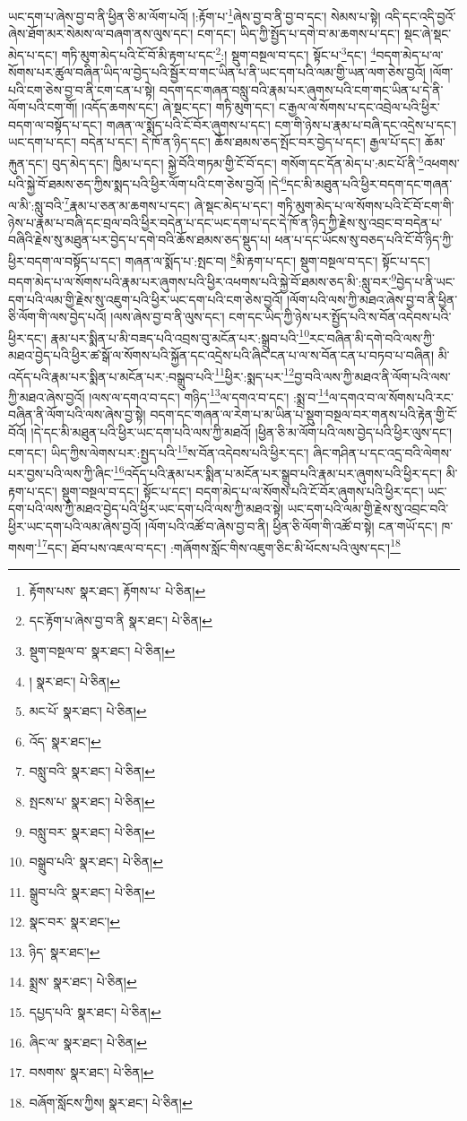 ཡང་དག་པ་ཞེས་བྱ་བ་ནི་ཕྱིན་ཅི་མ་ལོག་པའོ། །:རྟོག་པ་\footnote{རྟོགས་པས་  སྣར་ཐང་། རྟོགས་པ་  པེ་ཅིན། }ཞེས་བྱ་བ་ནི་བྱ་བ་དང་། སེམས་པ་སྟེ། འདི་དང་འདི་བྱའོ་ཞེས་ཐོག་མར་སེམས་ལ་བཞག་ནས་ལུས་དང་། ངག་དང་། ཡིད་ཀྱི་སྤྱོད་པ་དགེ་བ་མ་ཆགས་པ་དང་། སྡང་ཞེ་སྡང་མེད་པ་དང་། གཏི་མུག་མེད་པའི་ངོ་བོ་མི་རྟག་པ་དང་\footnote{དང་རྟོག་པ་ཞེས་བྱ་བ་ནི  སྣར་ཐང་།  པེ་ཅིན། }:། སྡུག་བསྔལ་བ་དང་། སྟོང་པ་\footnote{སྡུག་བསྔལ་བ་  སྣར་ཐང་།  པེ་ཅིན། }དང་། \footnote{།    སྣར་ཐང་།  པེ་ཅིན། }བདག་མེད་པ་ལ་སོགས་པར་ཚུལ་བཞིན་ཡིད་ལ་བྱེད་པའི་སྦྱོར་བ་གང་ཡིན་པ་ནི་ཡང་དག་པའི་ལམ་གྱི་ཡན་ལག་ཅེས་བྱའོ། །ལོག་པའི་ངག་ཅེས་བྱ་བ་ནི་ངག་ངན་པ་སྟེ། བདག་དང་གཞན་བསླུ་བའི་རྣམ་པར་ཞུགས་པའི་ངག་གང་ཡིན་པ་དེ་ནི་ལོག་པའི་ངག་གོ། །འདོད་ཆགས་དང་། ཞེ་སྡང་དང་། གཏི་མུག་དང་། ང་རྒྱལ་ལ་སོགས་པ་དང་འབྲེལ་པའི་ཕྱིར་བདག་ལ་བསྟོད་པ་དང་། གཞན་ལ་སྨོད་པའི་ངོ་བོར་ཞུགས་པ་དང་། ངག་གི་ཉེས་པ་རྣམ་པ་བཞི་དང་འདྲེས་པ་དང་། ཡང་དག་པ་དང་། བདེན་པ་དང་། དེ་ཁོ་ན་ཉིད་དང་། ཆོས་ཐམས་ཅད་སྤོང་བར་བྱེད་པ་དང་། རྒྱལ་པོ་དང་། ཆོམ་རྐུན་དང་། བུད་མེད་དང་། ཁྱིམ་པ་དང་། སྐྱེ་བོའི་གཏམ་གྱི་ངོ་བོ་དང་། གསོག་དང་དོན་མེད་པ་:མང་པོ་ནི་\footnote{མང་པོ་  སྣར་ཐང་།  པེ་ཅིན། }འཕགས་པའི་སྐྱེ་བོ་ཐམས་ཅད་ཀྱིས་སྨད་པའི་ཕྱིར་ལོག་པའི་ངག་ཅེས་བྱའོ། །དེ་\footnote{འོད་  སྣར་ཐང་། }དང་མི་མཐུན་པའི་ཕྱིར་བདག་དང་གཞན་ལ་མི་:སླུ་བའི་\footnote{བསླུ་བའི་  སྣར་ཐང་།  པེ་ཅིན། }རྣམ་པ་ཅན་མ་ཆགས་པ་དང་། ཞེ་སྡང་མེད་པ་དང་། གཏི་མུག་མེད་པ་ལ་སོགས་པའི་ངོ་བོ་ངག་གི་ཉེས་པ་རྣམ་པ་བཞི་དང་བྲལ་བའི་ཕྱིར་བདེན་པ་དང་ཡང་དག་པ་དང་དེ་ཁོ་ན་ཉིད་ཀྱི་རྗེས་སུ་འབྲང་བ་བདེན་པ་བཞིའི་རྗེས་སུ་མཐུན་པར་བྱེད་པ་དགེ་བའི་ཆོས་ཐམས་ཅད་སྡུད་པ། ཕན་པ་དང་ཡོངས་སུ་བཅད་པའི་ངོ་བོ་ཉིད་ཀྱི་ཕྱིར་བདག་ལ་བསྟོད་པ་དང་། གཞན་ལ་སྨོད་པ་:སྤང་བ། \footnote{སྤངས་པ་  སྣར་ཐང་།  པེ་ཅིན། }མི་རྟག་པ་དང་། སྡུག་བསྔལ་བ་དང་། སྟོང་པ་དང་། བདག་མེད་པ་ལ་སོགས་པའི་རྣམ་པར་ཞུགས་པའི་ཕྱིར་འཕགས་པའི་སྐྱེ་བོ་ཐམས་ཅད་མི་:སླུ་བར་\footnote{བསླུ་བར་  སྣར་ཐང་།  པེ་ཅིན། }བྱེད་པ་ནི་ཡང་དག་པའི་ལམ་གྱི་རྗེས་སུ་འཇུག་པའི་ཕྱིར་ཡང་དག་པའི་ངག་ཅེས་བྱའོ། །ལོག་པའི་ལས་ཀྱི་མཐའ་ཞེས་བྱ་བ་ནི་ཕྱིན་ཅི་ལོག་གི་ལས་བྱེད་པའོ། །ལས་ཞེས་བྱ་བ་ནི་ལུས་དང་། ངག་དང་ཡིད་ཀྱི་ཉེས་པར་སྤྱོད་པའི་ས་བོན་འདེབས་པའི་ཕྱིར་དང་། རྣམ་པར་སྨིན་པ་མི་བཟད་པའི་འབྲས་བུ་མངོན་པར་:སྒྲུབ་པའི་\footnote{བསྒྲུབ་པའི་  སྣར་ཐང་།  པེ་ཅིན། }རང་བཞིན་མི་དགེ་བའི་ལས་ཀྱི་མཐའ་བྱེད་པའི་ཕྱིར་ཚ་སྒོ་ལ་སོགས་པའི་སྐྱོན་དང་འདྲེས་པའི་ཞིང་ངན་པ་ལ་ས་བོན་ངན་པ་བཏབ་པ་བཞིན། མི་འདོད་པའི་རྣམ་པར་སྨིན་པ་མངོན་པར་:བསྒྲུབ་པའི་\footnote{སྒྲུབ་པའི་  སྣར་ཐང་།  པེ་ཅིན། }ཕྱིར་:སྨད་པར་\footnote{སྣང་བར་  སྣར་ཐང་། }བྱ་བའི་ལས་ཀྱི་མཐའ་ནི་ལོག་པའི་ལས་ཀྱི་མཐའ་ཞེས་བྱའོ། །ལས་ལ་དགའ་བ་དང་། གཉིད་\footnote{ཉིད་  སྣར་ཐང་། }ལ་དགའ་བ་དང་། :སྨྲ་བ་\footnote{སྨྲས་  སྣར་ཐང་།  པེ་ཅིན། }ལ་དགའ་བ་ལ་སོགས་པའི་རང་བཞིན་ནི་ལོག་པའི་ལས་ཞེས་བྱ་སྟེ། བདག་དང་གཞན་ལ་རེག་པ་མ་ཡིན་པ་སྡུག་བསྔལ་བར་གནས་པའི་རྟེན་གྱི་ངོ་བོའོ། །དེ་དང་མི་མཐུན་པའི་ཕྱིར་ཡང་དག་པའི་ལས་ཀྱི་མཐའོ། །ཕྱིན་ཅི་མ་ལོག་པའི་ལས་བྱེད་པའི་ཕྱིར་ལུས་དང་། ངག་དང་། ཡིད་ཀྱིས་ལེགས་པར་:སྤྱད་པའི་\footnote{དཔྱད་པའི་  སྣར་ཐང་།  པེ་ཅིན། }ས་བོན་འདེབས་པའི་ཕྱིར་དང་། ཞིང་གཤིན་པ་དང་འདྲ་བའི་ལེགས་པར་བྱས་པའི་ལས་ཀྱི་ཞིང་\footnote{ཞིང་ལ་  སྣར་ཐང་།  པེ་ཅིན། }འདོད་པའི་རྣམ་པར་སྨིན་པ་མངོན་པར་སྒྲུབ་པའི་རྣམ་པར་ཞུགས་པའི་ཕྱིར་དང་། མི་རྟག་པ་དང་། སྡུག་བསྔལ་བ་དང་། སྟོང་པ་དང་། བདག་མེད་པ་ལ་སོགས་པའི་ངོ་བོར་ཞུགས་པའི་ཕྱིར་དང་། ཡང་དག་པའི་ལས་ཀྱི་མཐའ་བྱེད་པའི་ཕྱིར་ཡང་དག་པའི་ལས་ཀྱི་མཐའ་སྟེ། ཡང་དག་པའི་ལམ་གྱི་རྗེས་སུ་འབྲང་བའི་ཕྱིར་ཡང་དག་པའི་ལམ་ཞེས་བྱའོ། །ལོག་པའི་འཚོ་བ་ཞེས་བྱ་བ་ནི། ཕྱིན་ཅི་ལོག་གི་འཚོ་བ་སྟེ། ངན་གཡོ་དང་། ཁ་གསག་\footnote{བསགས་  སྣར་ཐང་།  པེ་ཅིན། }དང་། ཐོབ་པས་འཇལ་བ་དང་། :གཞོགས་སློང་གིས་འཇུག་ཅིང་མི་ཕོངས་པའི་ལུས་དང་།\footnote{བཞོག་སློངས་ཀྱིས།  སྣར་ཐང་།  པེ་ཅིན། } 